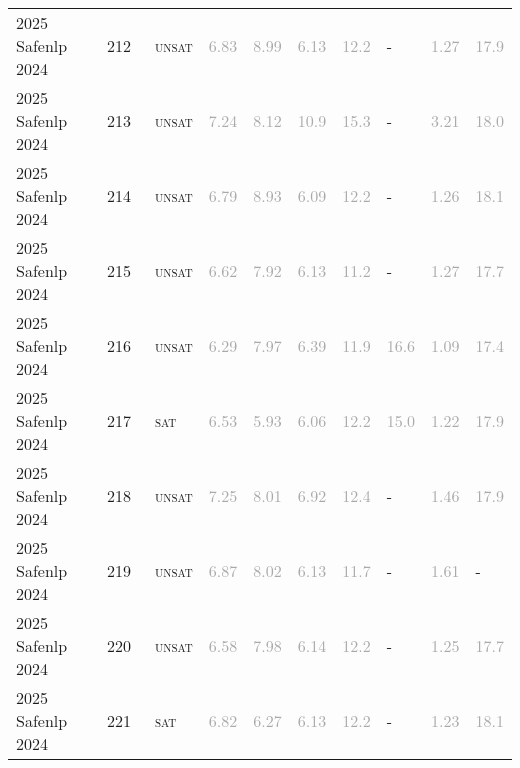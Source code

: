 \begin{center}
{\begin{longtable}{@{}llllllllll@{}}
2025 Safenlp 2024 & 212 & ~\textsc{unsat} & \textcolor{darkgray}{6.83} & \textcolor{darkgray}{8.99} & \textcolor{darkgray}{6.13} & \textcolor{darkgray}{12.2} & - & \textcolor{darkgray}{1.27} & \textcolor{darkgray}{17.9} \\
2025 Safenlp 2024 & 213 & ~\textsc{unsat} & \textcolor{darkgray}{7.24} & \textcolor{darkgray}{8.12} & \textcolor{darkgray}{10.9} & \textcolor{darkgray}{15.3} & - & \textcolor{darkgray}{3.21} & \textcolor{darkgray}{18.0} \\
2025 Safenlp 2024 & 214 & ~\textsc{unsat} & \textcolor{darkgray}{6.79} & \textcolor{darkgray}{8.93} & \textcolor{darkgray}{6.09} & \textcolor{darkgray}{12.2} & - & \textcolor{darkgray}{1.26} & \textcolor{darkgray}{18.1} \\
2025 Safenlp 2024 & 215 & ~\textsc{unsat} & \textcolor{darkgray}{6.62} & \textcolor{darkgray}{7.92} & \textcolor{darkgray}{6.13} & \textcolor{darkgray}{11.2} & - & \textcolor{darkgray}{1.27} & \textcolor{darkgray}{17.7} \\
2025 Safenlp 2024 & 216 & ~\textsc{unsat} & \textcolor{darkgray}{6.29} & \textcolor{darkgray}{7.97} & \textcolor{darkgray}{6.39} & \textcolor{darkgray}{11.9} & \textcolor{darkgray}{16.6} & \textcolor{darkgray}{1.09} & \textcolor{darkgray}{17.4} \\
2025 Safenlp 2024 & 217 & ~\textsc{sat} & \textcolor{darkgray}{6.53} & \textcolor{darkgray}{5.93} & \textcolor{darkgray}{6.06} & \textcolor{darkgray}{12.2} & \textcolor{darkgray}{15.0} & \textcolor{darkgray}{1.22} & \textcolor{darkgray}{17.9} \\
2025 Safenlp 2024 & 218 & ~\textsc{unsat} & \textcolor{darkgray}{7.25} & \textcolor{darkgray}{8.01} & \textcolor{darkgray}{6.92} & \textcolor{darkgray}{12.4} & - & \textcolor{darkgray}{1.46} & \textcolor{darkgray}{17.9} \\
2025 Safenlp 2024 & 219 & ~\textsc{unsat} & \textcolor{darkgray}{6.87} & \textcolor{darkgray}{8.02} & \textcolor{darkgray}{6.13} & \textcolor{darkgray}{11.7} & - & \textcolor{darkgray}{1.61} & - \\
2025 Safenlp 2024 & 220 & ~\textsc{unsat} & \textcolor{darkgray}{6.58} & \textcolor{darkgray}{7.98} & \textcolor{darkgray}{6.14} & \textcolor{darkgray}{12.2} & - & \textcolor{darkgray}{1.25} & \textcolor{darkgray}{17.7} \\
2025 Safenlp 2024 & 221 & ~\textsc{sat} & \textcolor{darkgray}{6.82} & \textcolor{darkgray}{6.27} & \textcolor{darkgray}{6.13} & \textcolor{darkgray}{12.2} & - & \textcolor{darkgray}{1.23} & \textcolor{darkgray}{18.1} \\

\end{longtable}}
\end{center}
